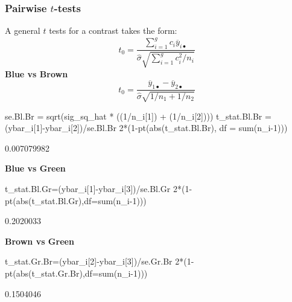 \documentclass[a4paper]{article}
\begin{document}
\subsubsection{Pairwise \( t \)-tests}
A general \( t \) tests for a contrast takes the form:
\[
	t_0 = \frac{\sum_{i=1}^g c_i \overline{y}_{i\bullet}}{\hat{\sigma} \sqrt{\sum_{i=1}^g c_i^2/n_i}}
\]
\textbf{Blue vs Brown}
\[
	t_0 = \frac{\overline{y}_{1\bullet} - \overline{y}_{2\bullet}}{\hat{\sigma} \sqrt{1/n_1 + 1/n_2}}
\]
\begin{Schunk}
\begin{Sinput}
se.Bl.Br = sqrt(sig_sq_hat *
                  ((1/n_i[1]) + (1/n_i[2])))
t_stat.Bl.Br = (ybar_i[1]-ybar_i[2])/se.Bl.Br
2*(1-pt(abs(t_stat.Bl.Br), df = sum(n_i-1)))
\end{Sinput}
\begin{Soutput}
[1] 0.007079982
\end{Soutput}
\end{Schunk}
\textbf{Blue vs Green}
\begin{Schunk}
\begin{Sinput}
t_stat.Bl.Gr=(ybar_i[1]-ybar_i[3])/se.Bl.Gr
2*(1-pt(abs(t_stat.Bl.Gr),df=sum(n_i-1)))
\end{Sinput}
\begin{Soutput}
[1] 0.2020033
\end{Soutput}
\end{Schunk}
\textbf{Brown vs Green}
\begin{Schunk}
\begin{Sinput}
t_stat.Gr.Br=(ybar_i[2]-ybar_i[3])/se.Gr.Br
2*(1-pt(abs(t_stat.Gr.Br),df=sum(n_i-1)))
\end{Sinput}
\begin{Soutput}
[1] 0.1504046
\end{Soutput}
\end{Schunk}
\end{document}
